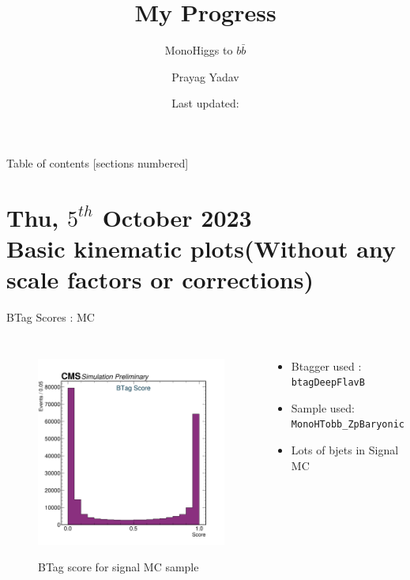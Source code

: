 \documentclass[10pt,xcolor=dvipsnames]{beamer}
\title{My Progress}
\subtitle{MonoHiggs to $b \bar{b}$}
\author{Prayag Yadav}
\institute{University of Hyderabad}
\date{Last updated: \DTMnow{}}
\begin{document}
\maketitle

\begin{frame}{Table of contents}
  [sections numbered]
  \tableofcontents%
\end{frame}

\section[Basic kinematic plots ]{\small{Thu, $5^{th}$ October 2023 } \\ Basic kinematic plots(\tiny{Without any scale factors or corrections}) }

  \begin{frame}[fragile]{BTag Scores : MC} 
    \begin{columns}
    \begin{figure} 
    \centering 
     \includegraphics[width=1\textwidth]{../Archive/KinemPlots/TagMC.png }
    \label{TagMC} 
    \caption{BTag score for signal MC sample}
    \end{figure} 
    \begin{itemize} 
    \raggedright 
    \small
    \item {Btagger used : \texttt{btagDeepFlavB}} 
    \item {Sample used: \texttt{MonoHTobb\_ZpBaryonic}} 
    \item Lots of bjets in Signal MC 
    \end{itemize}
    \end{columns} 
    \end{frame} 
    
\end{document}
